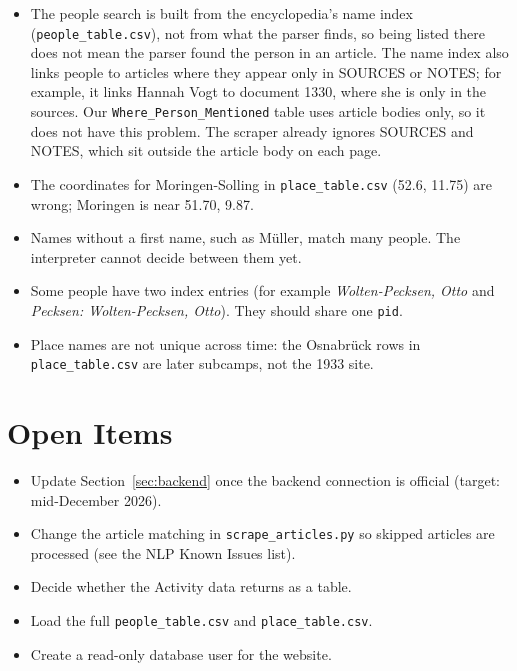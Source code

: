 \documentclass[11pt]{article}
\newcommand{\code}[1]{\texttt{#1}}
\begin{document}
\begin{itemize}
  \item The people search is built from the encyclopedia's name index
  (\code{people\_table.csv}), not from what the parser finds, so being
  listed there does not mean the parser found the person in an article.
  The name index also links people to articles where they appear only in
  SOURCES or NOTES; for example, it links Hannah Vogt to document 1330,
  where she is only in the sources. Our \code{Where\_Person\_Mentioned}
  table uses article bodies only, so it does not have this problem. The
  scraper already ignores SOURCES and NOTES, which sit outside the article
  body on each page.
  \item The coordinates for Moringen-Solling in \code{place\_table.csv}
  (52.6, 11.75) are wrong; Moringen is near 51.70, 9.87.
  \item Names without a first name, such as Müller, match many people.
  The interpreter cannot decide between them yet.
  \item Some people have two index entries (for example
  \textit{Wolten-Pecksen, Otto} and \textit{Pecksen: Wolten-Pecksen,
  Otto}). They should share one \code{pid}.
  \item Place names are not unique across time: the Osnabrück rows in
  \code{place\_table.csv} are later subcamps, not the 1933 site.
\end{itemize}

\section{Open Items}

\begin{itemize}
  \item Update Section~\ref{sec:backend} once the backend connection is
  official (target: mid-December 2026).
  \item Change the article matching in \code{scrape\_articles.py} so
  skipped articles are processed (see the NLP Known Issues list).
  \item Decide whether the Activity data returns as a table.
  \item Load the full \code{people\_table.csv} and \code{place\_table.csv}.
  \item Create a read-only database user for the website.
\end{itemize}

\appendix
\end{document}
